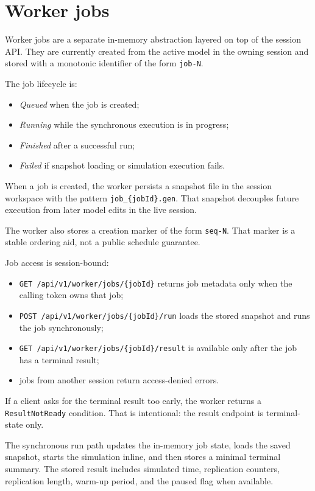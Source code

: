 \section{Worker jobs}
\label{sec:worker-jobs}

Worker jobs are a separate in-memory abstraction layered on top of the session
API. They are currently created from the active model in the owning session and
stored with a monotonic identifier of the form \texttt{job-N}.

The job lifecycle is:
\begin{itemize}
\item \textit{Queued} when the job is created;
\item \textit{Running} while the synchronous execution is in progress;
\item \textit{Finished} after a successful run;
\item \textit{Failed} if snapshot loading or simulation execution fails.
\end{itemize}

When a job is created, the worker persists a snapshot file in the session
workspace with the pattern \texttt{job\_\{jobId\}.gen}. That snapshot decouples
future execution from later model edits in the live session.

The worker also stores a creation marker of the form \texttt{seq-N}. That
marker is a stable ordering aid, not a public schedule guarantee.

Job access is session-bound:
\begin{itemize}
\item \texttt{GET /api/v1/worker/jobs/\{jobId\}} returns job metadata only when
the calling token owns that job;
\item \texttt{POST /api/v1/worker/jobs/\{jobId\}/run} loads the stored
snapshot and runs the job synchronously;
\item \texttt{GET /api/v1/worker/jobs/\{jobId\}/result} is available only after
the job has a terminal result;
\item jobs from another session return access-denied errors.
\end{itemize}

If a client asks for the terminal result too early, the worker returns a
\texttt{ResultNotReady} condition. That is intentional: the result endpoint is
terminal-state only.

The synchronous run path updates the in-memory job state, loads the saved
snapshot, starts the simulation inline, and then stores a minimal terminal
summary. The stored result includes simulated time, replication counters,
replication length, warm-up period, and the paused flag when available.

